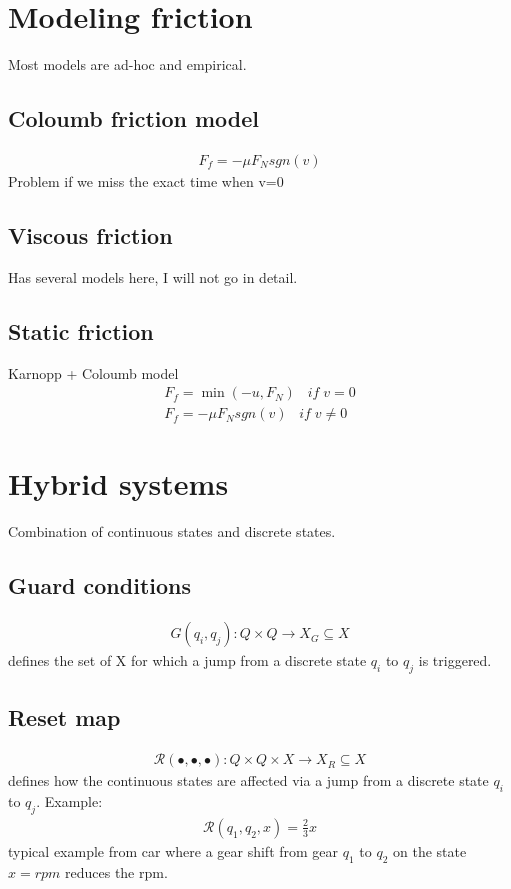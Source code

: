 \section{Modeling friction}
Most models are ad-hoc and empirical. 
\subsection{Coloumb friction model}
\begin{align}
    F_f = -\mu F_N sgn(v)
\end{align}
Problem if we miss the exact time when v=0

\subsection{Viscous friction}
Has several models here, I will not go in detail.

\subsection{Static friction}
Karnopp + Coloumb model
\begin{align}
    F_f = \min(-u,F_N) \;\;\; if \; v=0 \\
    F_f = -\mu F_N sgn(v) \;\;\; if \; v\neq0
\end{align}

\section{Hybrid systems}
Combination of continuous states and discrete states.

\subsection{Guard conditions}
\begin{align}
    G(q_i,q_j): Q \times Q \rightarrow X_G\subseteq X
\end{align}
defines the set of X for which a jump from a discrete state $q_i$ to $q_j$ is triggered.

\subsection{Reset map}
\begin{align}
    \mathcal{R}(\bullet,\bullet,\bullet): Q \times Q \times X \rightarrow X_R \subseteq X
\end{align}
defines how the continuous states are affected via a jump from a discrete state $q_i$ to $q_j$. Example:
\begin{align}
    \mathcal{R}(q_1,q_2,x) = \frac{2}{3} x
\end{align}
typical example from car where a gear shift from gear $q_1$ to $q_2$ on the state $x=rpm$ reduces the rpm.

